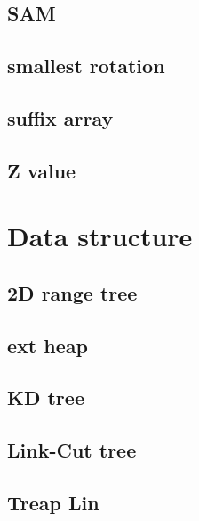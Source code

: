 	\subsection{SAM}
		
	\subsection{smallest rotation }
		
	\subsection{suffix array}
		
	\subsection{Z value}
		

\section{Data structure}
	\subsection{2D range tree}
		
	\subsection{ext heap}
		
	\subsection{KD tree}
		
	\subsection{Link-Cut tree}
		
%		
%		
	\subsection{Treap Lin}
		

